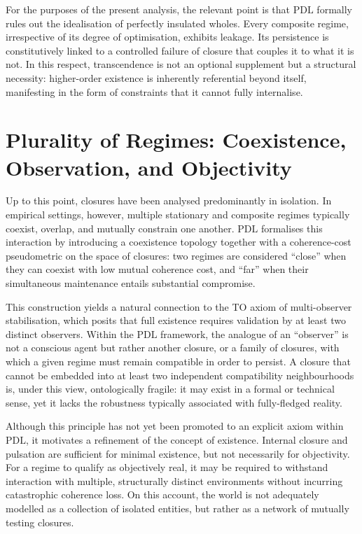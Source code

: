 \documentclass{article}
\theoremstyle{definition}
\newcommand{\PDL}{\ensuremath{\mathrm{PDL}}}
\begin{document}
For the purposes of the present analysis, the relevant point is that \PDL{} formally rules out the idealisation of perfectly insulated wholes.
Every composite regime, irrespective of its degree of optimisation, exhibits leakage.
Its persistence is constitutively linked to a controlled failure of closure that couples it to what it is not.
In this respect, transcendence is not an optional supplement but a structural necessity: higher-order existence is inherently referential beyond itself, manifesting in the form of constraints that it cannot fully internalise.

\section{Plurality of Regimes: Coexistence, Observation, and Objectivity}
\label{sec:coexistence}

Up to this point, closures have been analysed predominantly in isolation.
In empirical settings, however, multiple stationary and composite regimes typically coexist, overlap, and mutually constrain one another.
\PDL{} formalises this interaction by introducing a coexistence topology together with a coherence-cost pseudometric on the space of closures: two regimes are considered ``close'' when they can coexist with low mutual coherence cost, and ``far'' when their simultaneous maintenance entails substantial compromise.%
\cite{PDL_Topological_2026,PDL_Global_Mapping_2026_v3}

This construction yields a natural connection to the TO axiom of multi-observer stabilisation, which posits that full existence requires validation by at least two distinct observers.%
\cite{PDL_TO_Dialogue_2026}
Within the \PDL{} framework, the analogue of an ``observer'' is not a conscious agent but rather another closure, or a family of closures, with which a given regime must remain compatible in order to persist.
A closure that cannot be embedded into at least two independent compatibility neighbourhoods is, under this view, ontologically fragile: it may exist in a formal or technical sense, yet it lacks the robustness typically associated with fully-fledged reality.%
\cite{PDL_Position_2026}

Although this principle has not yet been promoted to an explicit axiom within \PDL{}, it motivates a refinement of the concept of existence.
Internal closure and pulsation are sufficient for minimal existence, but not necessarily for objectivity.
For a regime to qualify as objectively real, it may be required to withstand interaction with multiple, structurally distinct environments without incurring catastrophic coherence loss.
On this account, the world is not adequately modelled as a collection of isolated entities, but rather as a network of mutually testing closures.
\end{document}
